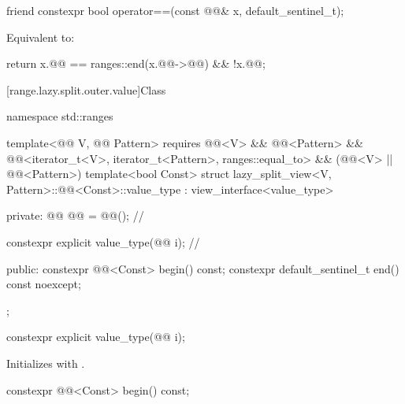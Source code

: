 %
\begin{itemdecl}
friend constexpr bool operator==(const @@& x, default_sentinel_t);
\end{itemdecl}

\begin{itemdescr}
\pnum
\effects
Equivalent to:
\begin{codeblock}
return x.@@ == ranges::end(x.@@->@@) && !x.@@;
\end{codeblock}
\end{itemdescr}

[range.lazy.split.outer.value]{Class }

%
\begin{codeblock}
namespace std::ranges {
  template<@@ V, @@ Pattern>
    requires @@<V> && @@<Pattern> &&
             @@<iterator_t<V>, iterator_t<Pattern>, ranges::equal_to> &&
             (@@<V> || @@<Pattern>)
  template<bool Const>
  struct lazy_split_view<V, Pattern>::@@<Const>::value_type
    : view_interface<value_type> {
  private:
    @@ @@ = @@();               // \expos

    constexpr explicit value_type(@@ i);    // \expos

  public:
    constexpr @@<Const> begin() const;
    constexpr default_sentinel_t end() const noexcept;
  };
}
\end{codeblock}

%
\begin{itemdecl}
constexpr explicit value_type(@@ i);
\end{itemdecl}

\begin{itemdescr}
\pnum
\effects
Initializes  with .
\end{itemdescr}

%
\begin{itemdecl}
constexpr @@<Const> begin() const;
\end{itemdecl}

